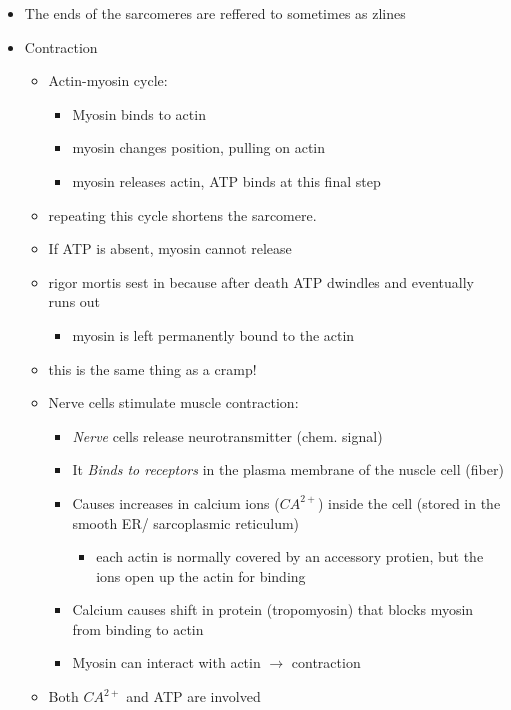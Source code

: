 \documentclass{article}
\theoremstyle{definition}
\begin{document}
\begin{itemize}
	\item The ends of the sarcomeres are reffered to sometimes as zlines
	\item Contraction
		\begin{itemize}
			\item Actin-myosin cycle:
				\begin{itemize}
					\item Myosin binds to actin
					\item myosin changes position, pulling on actin
					\item myosin releases actin, ATP binds at this final step
				\end{itemize}
			\item repeating this cycle shortens the sarcomere.
			\item If ATP is absent, myosin cannot release
			\item rigor mortis sest  in because after death ATP dwindles and eventually runs out
				\begin{itemize}
					\item myosin is left permanently bound to the actin
				\end{itemize}
			\item this is the same thing as a cramp!
			\item Nerve cells stimulate muscle contraction:
				\begin{itemize}
					\item \textit{Nerve}  cells release neurotransmitter (chem. signal)
					\item It \textit{Binds to receptors}  in the plasma membrane of the nuscle cell (fiber)
					\item Causes increases in calcium ions ($CA^{2+}$) inside the cell (stored in the smooth ER/ sarcoplasmic reticulum)
						\begin{itemize}
							\item each actin is normally covered by an accessory protien, but the ions open up the actin for binding
						\end{itemize}
					\item Calcium causes shift in protein (tropomyosin) that blocks myosin from binding to actin
					\item Myosin can interact with actin $\to$ contraction
				\end{itemize}
			\item Both $CA^{2+}$ and ATP are involved
		\end{itemize}

\end{itemize}
\end{document}
